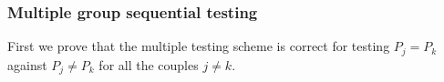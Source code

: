 \documentclass{article}
\theoremstyle{plain}
\theoremstyle{remark}
\renewcommand{\P}{\mathbb{P}}
\newcommand{\E}{\mathbb{E}}
\newcommand{\1}{\mathbbm{1}}
\newcommand{\id}{\mathrm{id}}
\numberwithin{equation}{section}
\begin{document}

\subsubsection{Multiple group sequential testing}
First we prove that the multiple testing scheme is correct for testing $ P_j = P_k$ against $ P_j \neq P_k$ for all the couples $j \neq k$. 
\end{document}
